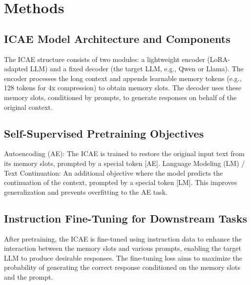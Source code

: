 \chapter{Methods}


\section{ICAE Model Architecture and Components}

The ICAE structure consists of two modules: a lightweight encoder (LoRA-adapted LLM) and a fixed decoder (the target LLM, e.g., Qwen or Llama). The encoder processes the long context and appends learnable memory tokens (e.g., 128 tokens for 4x compression) to obtain memory slots. The decoder uses these memory slots, conditioned by prompts, to generate responses on behalf of the original context.


\section{Self-Supervised Pretraining Objectives}

Autoencoding (AE): The ICAE is trained to restore the original input text from its memory slots, prompted by a special token [AE]. Language Modeling (LM) / Text Continuation: An additional objective where the model predicts the continuation of the context, prompted by a special token [LM]. This improves generalization and prevents overfitting to the AE task.


\section{Instruction Fine-Tuning for Downstream Tasks}

After pretraining, the ICAE is fine-tuned using instruction data to enhance the interaction between the memory slots and various prompts, enabling the target LLM to produce desirable responses. The fine-tuning loss aims to maximize the probability of generating the correct response conditioned on the memory slots and the prompt.


